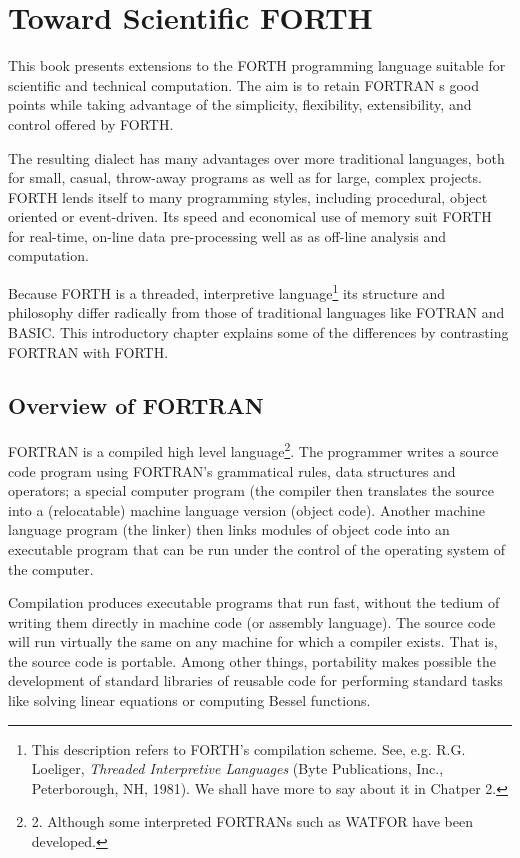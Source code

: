 \chapter{Toward Scientific FORTH}
This book presents extensions to the FORTH programming language suitable for scientific and technical computation. The aim is to retain FORTRAN s good points while taking advantage of the simplicity, flexibility, extensibility, and control offered by FORTH.

The resulting dialect has many advantages over more traditional languages, both for small, casual, throw-away programs as well as for large, complex projects. FORTH lends itself to many programming styles, including procedural, object oriented or event-driven. Its speed and economical use of memory suit FORTH for real-time, on-line data pre-processing well as as off-line analysis and computation.

Because FORTH is a threaded, interpretive language\footnote{This description refers to FORTH's compilation scheme. See, e.g. R.G. Loeliger, \textit{Threaded Interpretive Languages} (Byte Publications, Inc., Peterborough, NH, 1981). We shall have more to say about it in Chatper 2.} its  structure and philosophy differ radically from those of traditional languages like FOTRAN and BASIC. This introductory chapter explains some of the differences by contrasting FORTRAN with FORTH.

\section{Overview of FORTRAN}

FORTRAN is a compiled high level language\footnote{2. Although some interpreted FORTRANs such as WATFOR have been developed.}. The programmer writes a source code program using FORTRAN's grammatical rules, data structures and operators; a special computer program (the compiler then translates the source into a (relocatable) machine language version (object code). Another machine language program (the linker) then links modules of object code into an executable program that can be run under the control of the operating system of the computer.

Compilation produces executable programs that run fast, without the tedium of writing them directly in machine code (or assembly language). The source code will run virtually the same on any machine for which a compiler exists. That is, the source code is 
portable. Among other things, portability makes possible the development of standard libraries of reusable code for performing standard tasks like solving linear equations or computing Bessel functions.

